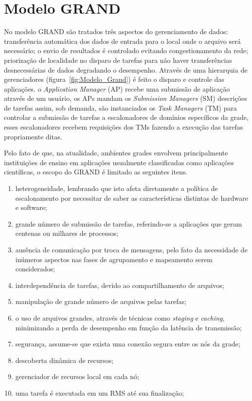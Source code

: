 \chapter{Modelo GRAND}
\label{cap:grand}

No modelo GRAND são tratados três aspectos do gerenciamento de dados: transferência automática dos dados de entrada para o local onde o arquivo será necessário; o envio de resultados é controlado evitando congestionamento da rede; priorização de localidade no disparo de tarefas para não haver transferências desnecessárias de dados degradando o desempenho. Através de uma hierarquia de gerenciadores (figura~\ref{fig:Modelo_Grand}) é feito o disparo e controle das aplicações. o \emph{Application Manager} (AP) recebe uma submissão de aplicação através de um usuário, os APs mandam os \emph{Submission Managers} (SM) descrições de tarefas assim, sob demanda, são instanciados os \emph{Task Managers} (TM) para controlar a submissão de tarefas a escalonadores de domínios específicos da grade, esses escalonadores recebem requisições dos TMs fazendo a execução das tarefas propriamente ditas.

Pelo fato de que, na atualidade, ambientes grades envolvem principalmente instituições de ensino em aplicações usualmente classificadas como aplicações científicas, o escopo do GRAND é limitado as seguintes itens. 

\begin{enumerate}
    \item heterogeneidade, lembrando que isto afeta diretamente a política de escalonamento por necessitar de saber as características distintas de hardware e software; 
    \item grande número de submissão de tarefas, referindo-se a aplicações que geram centenas ou milhares de processos; 
    \item ausência de comunicação por troca de mensagens, pelo fato da necessidade de inúmeros aspectos nas fases de agrupamento e mapeamento serem considerados; 
    \item interdependência de tarefas, devido ao compartilhamento de arquivos; 
    \item manipulação de grande número de arquivos pelas tarefas; 
    \item o uso de arquivos grandes, através de técnicas como \emph{staging} e \emph{caching}, minimizando a perda de desempenho em função da latência de transmissão; 
    \item segurança, assume-se que exista uma conexão segura entre os nós da grade; 
    \item descoberta dinâmica de recursos; 
    \item gerenciador de recursos local em cada nó; 
    \item uma tarefa é executada em um RMS até sua finalização;
\end{enumerate}


